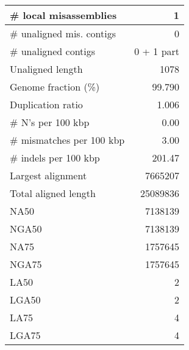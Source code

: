 \documentclass[12pt,a4paper]{article}
\begin{document}
\begin{table}[ht]
\begin{center}
\begin{tabular}{|l*{1}{|r}|}
\# local misassemblies & 1 \\ \hline
\# unaligned mis. contigs & 0 \\ \hline
\# unaligned contigs & 0 + 1 part \\ \hline
Unaligned length & 1078 \\ \hline
Genome fraction (\%) & 99.790 \\ \hline
Duplication ratio & 1.006 \\ \hline
\# N's per 100 kbp & 0.00 \\ \hline
\# mismatches per 100 kbp & 3.00 \\ \hline
\# indels per 100 kbp & 201.47 \\ \hline
Largest alignment & 7665207 \\ \hline
Total aligned length & 25089836 \\ \hline
NA50 & 7138139 \\ \hline
NGA50 & 7138139 \\ \hline
NA75 & 1757645 \\ \hline
NGA75 & 1757645 \\ \hline
LA50 & 2 \\ \hline
LGA50 & 2 \\ \hline
LA75 & 4 \\ \hline
LGA75 & 4 \\ \hline
\end{tabular}
\end{center}
\end{table}
\end{document}
